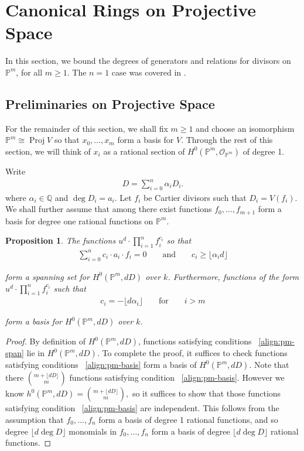 \documentclass{amsart}
\theoremstyle{plain}
\newtheorem{prop}[thm]{Proposition}
\theoremstyle{definition}
\theoremstyle{remark}
\numberwithin{equation}{section}
\newcommand\ssec{\subsection}
\newcommand\bq{{\mathbb Q}}
\newcommand\bp{{\mathbb P}}
\newcommand\sco{{\mathscr O}}
\newcommand\bida{a}
\DeclareMathOperator{\proj}{Proj}
\begin{document}
\section{Canonical Rings on Projective Space}
In this section, we bound the degrees of generators and relations for divisors on $\bp^m$, for all $m \geq 1$. The $n = 1$ case was covered in \cite{dorney:canonical}.

\ssec{Preliminaries on Projective Space}

For the remainder of this section, we shall fix $m \geq 1$ and choose an isomorphism $\bp^m \cong \proj V$ so that $x_0,\ldots, x_m$ form a basis for $V$. Through the rest of this section, we will think of $x_i$ as a rational section of $H^0(\bp^m, \sco_{\bp^m})$ of degree 1.


Write
\begin{align*}
	D = \sum_{i=0}^{n}\alpha_i D_i.
\end{align*}
where $\alpha_i \in \bq$ and $\deg D_i = \bida_i$. Let $f_i$ be Cartier divisors such that $D_i = V(f_i)$. We shall further assume that among there exist functions $f_0,\ldots, f_{m+1}$ form a basis for degree one rational functions on $\bp^m$.

\begin{prop}
\label{prop:pm-span-and-basis}
The functions $u^d \cdot \prod_{i=1}^n f_i^{c_i}$ so that 
\begin{align}
\label{align:pm-span}
\sum_{i=0}^{n} c_i \cdot \bida_i \cdot f_i = 0 && \text{ and } &&c_i \geq \lfloor \alpha_i d\rfloor	
\end{align}

\noindent
form a spanning set for $H^0(\bp^m, dD)$ over $k$. Furthermore, functions 
of the form $u^d \cdot \prod_{i=1}^n f_i^{c_i} $ such that
\begin{align}
\label{align:pm-basis}
c_i = -\lfloor d\alpha_i \rfloor && \text{ for } && i > m
\end{align}

\noindent
form a basis for $H^0(\bp^m, dD)$ over $k$.
\end{prop}

\begin{proof}
By definition of $H^0(\bp^m,dD)$, functions satisfying conditions 
~\eqref{align:pm-span} lie in $H^0(\bp^m,dD)$. To complete the proof, it suffices to check functions satisfying conditions ~\eqref{align:pm-basis} form a basis of $H^0(\bp^m,dD)$. Note that there $\binom{m+ \lfloor dD \rfloor }{m}$ functions satisfying condition ~\eqref{align:pm-basis}. However we know $h^0(\bp^m,dD) = \binom{m+ \lfloor dD \rfloor }{m},$ so it suffices to show that those functions satisfying condition ~\eqref{align:pm-basis} are independent. This follows from the assumption that $f_0,\ldots, f_n$ form a basis of degree 1 rational functions, and so degree $\lfloor d \deg D \rfloor $ monomials in $f_0,\ldots, f_n$ form a basis of degree $\lfloor d \deg D \rfloor $ rational functions.
\end{proof}
\end{document}
